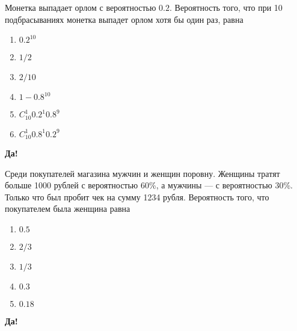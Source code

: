 \documentclass[t]{beamer}
\begin{document}
 \begin{frame} \label{7-Yes} 
\begin{block}{7} 

  Монетка выпадает орлом с вероятностью $0.2$. Вероятность того, что при 10 подбрасываниях монетка выпадет орлом хотя бы один раз, равна
  


 \end{block} 
\begin{enumerate} 
\item[] \hyperlink{7-No}{\beamergotobutton{} $0.2^10$}
\item[] \hyperlink{7-No}{\beamergotobutton{} $1/2$}
\item[] \hyperlink{7-No}{\beamergotobutton{} $2/10$}
\item[] \hyperlink{7-Yes}{\beamergotobutton{} $1 - 0.8^10$}
\item[] \hyperlink{7-No}{\beamergotobutton{} $C_{10}^1 0.2^{1}0.8^9$}
\item[] \hyperlink{7-No}{\beamergotobutton{} $C_{10}^1 0.8^{1}0.2^9$}
\end{enumerate} 

 \textbf{Да!} 
 \hyperlink{8}{}\end{frame} 


 \begin{frame} \label{8-Yes} 
\begin{block}{8} 

  Среди покупателей магазина мужчин и женщин поровну. Женщины тратят больше 1000 рублей с вероятностью 60\%, а мужчины — с вероятностью 30\%. Только что был пробит чек на сумму 1234 рубля. Вероятность того, что покупателем была женщина равна
  


 \end{block} 
\begin{enumerate} 
\item[] \hyperlink{8-No}{\beamergotobutton{} $0.5$}
\item[] \hyperlink{8-Yes}{\beamergotobutton{} $2/3$}
\item[] \hyperlink{8-No}{\beamergotobutton{} $1/3$}
\item[] \hyperlink{8-No}{\beamergotobutton{} $0.3$}
\item[] \hyperlink{8-No}{\beamergotobutton{} $0.18$}
\end{enumerate} 

 \textbf{Да!} 
 \hyperlink{9}{}\end{frame} 
\end{document}
